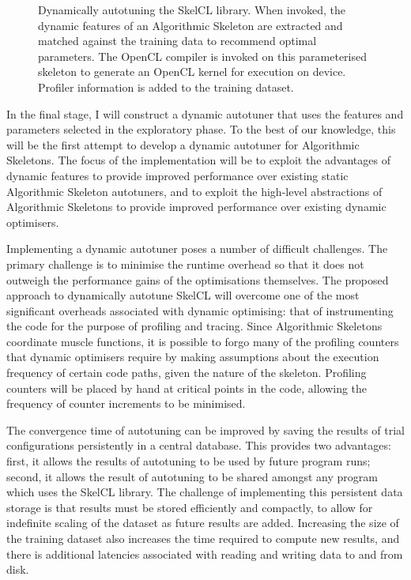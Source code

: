 \begin{figure}[t]

\caption{Dynamically autotuning the SkelCL library. When invoked, the
  dynamic features of an Algorithmic Skeleton are extracted and
  matched against the training data to recommend optimal
  parameters. The OpenCL compiler is invoked on this parameterised
  skeleton to generate an OpenCL kernel for execution on
  device. Profiler information is added to the training dataset.}
\label{fig:method}
\end{figure}

In the final stage, I will construct a dynamic autotuner that uses the
features and parameters selected in the exploratory phase. To the best
of our knowledge, this will be the first attempt to develop a dynamic
autotuner for Algorithmic Skeletons. The focus of the implementation
will be to exploit the advantages of dynamic features to provide
improved performance over existing static Algorithmic Skeleton
autotuners, and to exploit the high-level abstractions of Algorithmic
Skeletons to provide improved performance over existing dynamic
optimisers.

Implementing a dynamic autotuner poses a number of difficult
challenges. The primary challenge is to minimise the runtime overhead
so that it does not outweigh the performance gains of the
optimisations themselves. The proposed approach to dynamically
autotune SkelCL will overcome one of the most significant overheads
associated with dynamic optimising: that of instrumenting the code for
the purpose of profiling and tracing. Since Algorithmic Skeletons
coordinate muscle functions, it is possible to forgo many of the
profiling counters that dynamic optimisers require by making
assumptions about the execution frequency of certain code paths, given
the nature of the skeleton. Profiling counters will be placed by hand
at critical points in the code, allowing the frequency of counter
increments to be minimised.

The convergence time of autotuning can be improved by saving the
results of trial configurations persistently in a central
database. This provides two advantages: first, it allows the results
of autotuning to be used by future program runs; second, it allows the
result of autotuning to be shared amongst any program which uses the
SkelCL library. The challenge of implementing this persistent data
storage is that results must be stored efficiently and compactly, to
allow for indefinite scaling of the dataset as future results are
added. Increasing the size of the training dataset also increases the
time required to compute new results, and there is additional
latencies associated with reading and writing data to and from disk.
